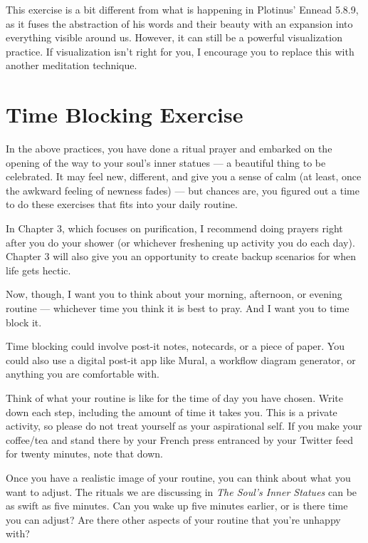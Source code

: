 \documentclass[
]{book}
\begin{document}
This exercise is a bit different from what is happening in Plotinus' Ennead 5.8.9, as it fuses the abstraction of his words and their beauty with an expansion into everything visible around us. However, it can still be a powerful visualization practice. If visualization isn't right for you, I encourage you to replace this with another meditation technique.

\hypertarget{time-blocking-exercise}{%
\section{Time Blocking Exercise}\label{time-blocking-exercise}}

In the above practices, you have done a ritual prayer and embarked on the opening of the way to your soul's inner statues --- a beautiful thing to be celebrated. It may feel new, different, and give you a sense of calm (at least, once the awkward feeling of newness fades) --- but chances are, you figured out a time to do these exercises that fits into your daily routine.

In Chapter 3, which focuses on purification, I recommend doing prayers right after you do your shower (or whichever freshening up activity you do each day). Chapter 3 will also give you an opportunity to create backup scenarios for when life gets hectic.

Now, though, I want you to think about your morning, afternoon, or evening routine --- whichever time you think it is best to pray. And I want you to time block it.

Time blocking could involve post-it notes, notecards, or a piece of paper. You could also use a digital post-it app like Mural, a workflow diagram generator, or anything you are comfortable with.

Think of what your routine is like for the time of day you have chosen. Write down each step, including the amount of time it takes you. This is a private activity, so please do not treat yourself as your aspirational self. If you make your coffee/tea and stand there by your French press entranced by your Twitter feed for twenty minutes, note that down.

Once you have a realistic image of your routine, you can think about what you want to adjust. The rituals we are discussing in \emph{The Soul's Inner Statues} can be as swift as five minutes. Can you wake up five minutes earlier, or is there time you can adjust? Are there other aspects of your routine that you're unhappy with?
\end{document}
